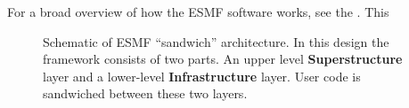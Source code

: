 For a broad overview of how the ESMF software works, see the 
.  This 

\begin{center}
\begin{figure}
\caption{Schematic of ESMF ``sandwich'' architecture. In this design the framework consists of two parts. An upper level
{\bf Superstructure} layer and a lower-level {\bf Infrastructure} layer. User code is sandwiched between these two layers.}
\label{fig:TheESMFwich}
\end{figure}
\end{center}













